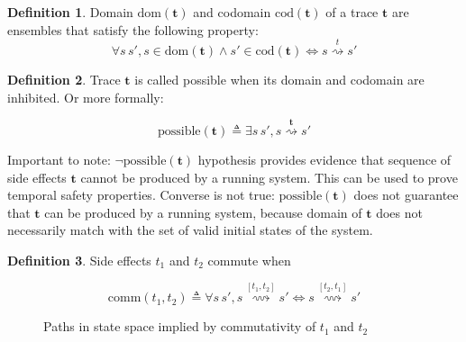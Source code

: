 \documentclass[10pt,letterpaper]{article}
\newcommand \dom[1]{\text{dom}\left(#1\right)}
\newcommand \cod[1]{\text{cod}\left(#1\right)}
\newcommand \chain[3]{\mathrel{#1\stackrel{#3}{\rightsquigarrow}#2}}
\newcommand \bm[1]{\boldsymbol{#1}}
\newcommand \comm[2]{\mathrel{\text{comm}\left(#1,#2\right)}}
\newcommand \possible[1]{\mathrel{\text{possible}\left({#1}\right)}}
\theoremstyle{definition}
\newtheorem{definition}{Definition}
\begin{document}
\begin{definition}
  Domain $\dom{\bm{t}}$ and codomain $\cod{\bm{t}}$ of a trace
  $\bm{t}$ are ensembles that satisfy the following property:
  \begin{equation}
    \forall s\, s', s \in \dom{\bm{t}} \land s' \in \cod{\bm{t}} \iff
    \chain{s}{s'}{t}
  \end{equation}
\end{definition}

\begin{definition}
  Trace $\bm{t}$ is called possible when its domain and codomain are
  inhibited. Or more formally:

  \begin{equation}
    \possible{\bm{t}} \triangleq \exists s\, s', \chain{s}{s'}{\bm{t}}
  \end{equation}
\end{definition}

Important to note: $\neg \possible{\bm{t}}$ hypothesis provides
evidence that sequence of side effects $\bm{t}$ cannot be produced by
a running system. This can be used to prove temporal safety
properties. Converse is not true: $\possible{\bm{t}}$ does not
guarantee that $\bm{t}$ can be produced by a running system, because
domain of $\bm{t}$ does not necessarily match with the set of valid
initial states of the system.

\begin{definition}
  Side effects $t_1$ and $t_2$ commute when

  \begin{equation}
  \comm{t_1}{t_2} \triangleq \forall s\,s', \chain{s}{s'}{[t_1,t_2]} \iff \chain{s}{s'}{[t_2,t_1]}
  \end{equation}

  \begin{figure}[h]
    \centering
    \caption{Paths in state space implied by commutativity of $t_1$ and $t_2$}
    \label{fig:comm}
  \end{figure}
\end{definition}
\end{document}
